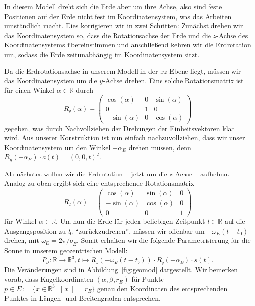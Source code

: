\documentclass[
    paper=a4,
    DIV14,
    fontsize=12pt,
    pagesize=pdftex,
    toc=bibliographynumbered
]{scrartcl}
\numberwithin{figure}{section}
\numberwithin{equation}{section}
\numberwithin{table}{section}
\newcommand*\setR{\mathds{R}}
\begin{document}
In diesem Modell dreht sich die Erde aber um ihre Achse, also sind feste Positionen auf
der Erde nicht fest im Koordinatensystem, was das Arbeiten umständlich macht. Dies
korrigieren wir in zwei Schritten: Zunächst drehen wir das Koordinatensystem so, dass
die Rotationsachse der Erde und die $z$-Achse des Koordinatensystems übereinstimmen und
anschließend kehren wir die Erdrotation um, sodass die Erde zeitunabhängig im
Koordinatensystem sitzt.

Da die Erdrotationsachse in unserem Modell in der $xz$-Ebene liegt, müssen wir das
Koordinatensystem um die $y$-Achse drehen. Eine solche Rotationsmatrix ist für einen
Winkel $\alpha\in\setR$ durch
\begin{equation*}
    R_y(\alpha) =
    \begin{pmatrix}
        \cos(\alpha)  & 0 & \sin(\alpha) \\
        0             & 1 & 0            \\
        -\sin(\alpha) & 0 & \cos(\alpha)
    \end{pmatrix}
\end{equation*}
gegeben, was durch Nachvollziehen der Drehungen der Einheitsvektoren klar wird. Aus
unserer Konstruktion ist nun einfach nachzuvollziehen, dass wir unser Koordinatensystem um
den Winkel $-\alpha_E$ drehen müssen, denn $R_y(-\alpha_E)\cdot a(t) = (0, 0, t)^T$.

Als nächstes wollen wir die Erdrotation -- jetzt um die $z$-Achse -- aufheben. Analog zu
oben ergibt sich eine entsprechende Rotationsmatrix
\begin{equation*}
    R_z(\alpha) =
    \begin{pmatrix}
         \cos(\alpha) & \sin(\alpha) & 0 \\
        -\sin(\alpha) & \cos(\alpha) & 0 \\
        0             & 0            & 1
    \end{pmatrix}
\end{equation*}
für Winkel $\alpha\in\setR$. Um nun die Erde für jeden beliebigen Zeitpunkt $t\in\setR$
auf die Ausgangsposition zu $t_0$ \enquote{zurückzudrehen}, müssen wir offenbar um
$-\omega_E(t-t_0)$ drehen, mit $\omega_E = 2\pi/p_E$. Somit erhalten wir die folgende
Parametrisierung für die Sonne in unserem geozentrischen Modell:
\begin{equation*}
    P_S : \setR \to \setR^3, t\mapsto R_z(-\omega_E(t-t_0)) \cdot R_y(-\alpha_E) \cdot
    s(t).
\end{equation*}
Die Veränderungen sind in Abbildung~\ref{fig:geomod} dargestellt. Wir bemerken vorab, dass
Kugelkoordinaten $(\alpha, \beta, r_E)$ für Punkte $p \in E := \{ x\in\setR^3 \mid \|x\| =
r_E \}$ genau den Koordinaten des entsprechenden Punktes in Längen- und Breitengraden
entsprechen.
\end{document}
